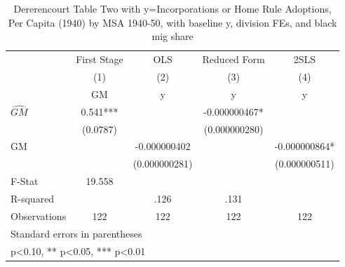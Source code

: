 \begin{table}[htbp]\centering
\def\sym#1{\ifmmode^{#1}\else\(^{#1}\)\fi}
\caption{Dererencourt Table Two with y=Incorporations or Home Rule Adoptions, Per Capita (1940) by MSA 1940-50, with baseline y, division FEs, and black mig share}
\begin{tabular}{l*{4}{c}}
\toprule
                    & First Stage   &         OLS   &Reduced Form   &        2SLS   \\
                    &\multicolumn{1}{c}{(1)}&\multicolumn{1}{c}{(2)}&\multicolumn{1}{c}{(3)}&\multicolumn{1}{c}{(4)}\\
                    &\multicolumn{1}{c}{GM}&\multicolumn{1}{c}{y}&\multicolumn{1}{c}{y}&\multicolumn{1}{c}{y}\\
\midrule
$\hat{GM}$          &       0.541***&               &-0.000000467*  &               \\
                    &    (0.0787)   &               &(0.000000280)   &               \\
\addlinespace
GM                  &               &-0.000000402   &               &-0.000000864*  \\
                    &               &(0.000000281)   &               &(0.000000511)   \\
\midrule
F-Stat              &      19.558   &               &               &               \\
R-squared           &               &        .126   &        .131   &               \\
Observations        &         122   &         122   &         122   &         122   \\
\bottomrule
\multicolumn{5}{l}{\footnotesize Standard errors in parentheses}\\
\multicolumn{5}{l}{\footnotesize * p<0.10, ** p<0.05, *** p<0.01}\\
\end{tabular}
\end{table}
